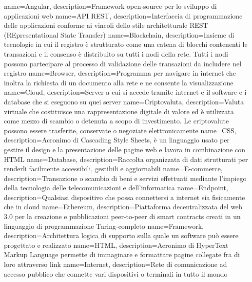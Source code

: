  { name=Angular, description={Framework open-source per lo sviluppo di applicazioni web} }
 { name={API REST}, description={Interfaccia di programmazione delle applicazioni conforme ai vincoli dello stile architetturale REST (REpresentational State Transfer)} }
 { name=Blockchain, description={Insieme di tecnologie in cui il registro è strutturato come una catena di blocchi contenenti le transazioni e il consenso è distribuito su tutti i nodi della rete. Tutti i nodi possono partecipare al processo di validazione delle transazioni da includere nel registro} }
 { name=Browser, description={Programma per navigare in internet che inoltra la richiesta di un documento alla rete e ne consente la visualizzazione} }
 { name={Cloud}, description={Server a cui si accede tramite internet e il software e i database che si eseguono su quei server} }
 { name={Criptovaluta}, description={Valuta virtuale che costituisce una rappresentazione digitale di valore ed è utilizzata come mezzo di scambio o detenuta a scopo di investimento. Le criptovalute possono essere trasferite, conservate o negoziate elettronicamente} }
 { name={CSS}, description={Acronimo di Cascading Style Sheets, è un linguaggio usato per gestire il design e la presentazione delle pagine web e lavora in combinazione con HTML} }
 { name={Database}, description={Raccolta organizzata di dati strutturati per renderli facilmente accessibili, gestibili e aggiornabili} }
 { name={E-commerce}, description={Transazione o scambio di beni e servizi effettuati mediante l'impiego della tecnologia delle telecomunicazioni e dell'informatica} }
 { name={Endpoint}, description={Qualsiasi dispositivo che possa connettersi a internet sia fisicamente che in cloud} }
 { name={Ethereum}, description={Piattaforma decentralizzata del web 3.0 per la creazione e pubblicazioni peer-to-peer di smart contracts creati in un linguaggio di programmazione Turing-completo} }
 { name={Framework}, description={Architettura logica di supporto sulla quale un software può essere progettato e realizzato} }
 { name={HTML}, description={Acronimo di HyperText Markup Language permette di immaginare e formattare pagine collegate fra di loro attraverso link} }
 { name={Internet}, description={Rete di comunicazione ad accesso pubblico che connette vari dispositivi o terminali in tutto il mondo} }
